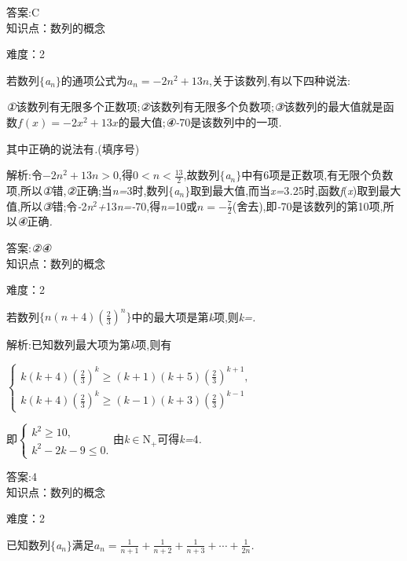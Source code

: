 \documentclass{article} %
\begin{document}
 答案:C \\

知识点：数列的概念

难度：2

 若数列$\mathrm{\{}$\textit{a${}_{n}$}$\mathrm{\}}$的通项公式为$a_n=-2n^2+13n$,关于该数列,有以下四种说法:

 \textit{①}该数列有无限多个正数项;\textit{②}该数列有无限多个负数项;\textit{③}该数列的最大值就是函数$f(x)=-2x^2+13x$的最大值;\textit{④-}70是该数列中的一项\textit{.}

 其中正确的说法有\textit{\underbar{　　　　　　}.}(填序号)~

 解析:令$-2n^2+13n>0$,得$0<n<\frac{13}{2}$,故数列$\mathrm{\{}$\textit{a${}_{n}$}$\mathrm{\}}$中有6项是正数项,有无限个负数项,所以\textit{①}错,\textit{②}正确;当\textit{n=}3时,数列$\mathrm{\{}$\textit{a${}_{n}$}$\mathrm{\}}$取到最大值,而当\textit{x=}3\textit{.}25时,函数\textit{f}(\textit{x})取到最大值,所以\textit{③}错;令\textit{-}2\textit{n}${}^{2}$\textit{+}13\textit{n=-}70,得\textit{n=}10或$n=-\frac{7}{2}$(舍去),即\textit{-}70是该数列的第10项,所以\textit{④}正确\textit{.}
 
 答案:\textit{②④}   \\

知识点：数列的概念

难度：2

 若数列$\{n(n+4)(\frac{2}{3})^n\}$中的最大项是第\textit{k}项,则\textit{k=\underbar{　　　　　}.~}

 解析:已知数列最大项为第\textit{k}项,则有

$\left\{
\begin{array}{l}
k(k+4)(\frac{2}{3})^k\ge (k+1)(k+5)(\frac{2}{3})^{k+1}, \\
k(k+4)(\frac{2}{3})^k\ge (k-1)(k+3)(\frac{2}{3})^{k-1}
\end{array}
\right.$

即$\left\{
\begin{array}{l}
k^2\ge 10, \\
k^2-2k-9\le 0.
\end{array}
\right.$由\textit{k}$\mathrm{\in}$N\textit{${}_{+}$}可得\textit{k=}4\textit{.}

 答案:4 \\

知识点：数列的概念

难度：2

 已知数列$\mathrm{\{}$\textit{a${}_{n}$}$\mathrm{\}}$满足$a_n = \frac{1}{n+1}+\frac{1}{n+2}+\frac{1}{n+3}+\cdots + \frac{1}{2n}$\textit{.}
\end{document}
